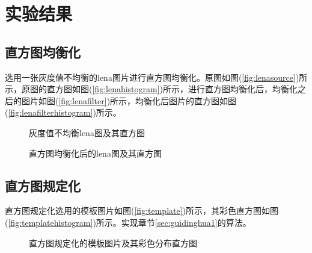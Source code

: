 \documentclass{hitreport}
\begin{document}
\section{实验结果}

\subsection{直方图均衡化}

选用一张灰度值不均衡的lena图片进行直方图均衡化。原图如图(\ref{fig:lenasource})所示，原图的直方图如图(\ref{fig:lenahistogram})所示，进行直方图均衡化后，均衡化之后的图片如图(\ref{fig:lenafilter})所示，均衡化后图片的直方图如图(\ref{fig:lenafilterhistogram})所示。

\begin{figure}[htb]
	\centering
	\hspace{20pt}
	\caption{灰度值不均衡lena图及其直方图}\label{fig:lena}
\end{figure}

\begin{figure}[htb]
	\centering
	\hspace{20pt}
	\caption{直方图均衡化后的lena图及其直方图}\label{fig:lenafilter1}
\end{figure}


\subsection{直方图规定化}

直方图规定化选用的模板图片如图(\ref{fig:template})所示，其彩色直方图如图(\ref{fig:templatehistogram})所示。实现章节\ref{sec:guidinghua1}的算法。

\begin{figure}[htb]
	\centering
	\hspace{20pt}
	\caption{直方图规定化的模板图片及其彩色分布直方图}\label{fig:template1}
\end{figure}
\end{document}
